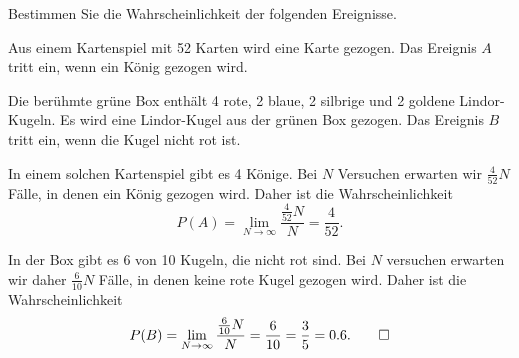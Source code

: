 Bestimmen Sie die Wahrscheinlichkeit der folgenden Ereignisse.
\begin{teilaufgaben}
\item
Aus einem Kartenspiel mit 52 Karten wird eine Karte gezogen.
Das Ereignis $A$ tritt ein, wenn ein König gezogen wird.
\item
Die berühmte grüne Box enthält 4 rote, 2 blaue,
2 silbrige und 2 goldene Lindor-Kugeln.
Es wird eine Lindor-Kugel aus der grünen Box gezogen.
Das Ereignis $B$ tritt ein, wenn die Kugel nicht rot ist.
\end{teilaufgaben}

\begin{loesung}
\begin{teilaufgaben}
\item
In einem solchen Kartenspiel gibt es 4 Könige.
Bei $N$ Versuchen erwarten wir $\frac4{52}N$ Fälle, in denen ein König
gezogen wird.
Daher ist die Wahrscheinlichkeit
\[
P(A)
=
\lim_{N\to\infty}
\frac{\frac4{52}N}{N}
=
\frac{4}{52}.
\]
\item
In der Box gibt es 6 von 10 Kugeln, die nicht rot sind.
Bei $N$ versuchen erwarten wir daher $\frac{6}{10}N$ Fälle, in denen
keine rote Kugel gezogen wird.
Daher ist die Wahrscheinlichkeit
\[
P(B)
=
\lim_{N\to\infty} \frac{\frac{6}{10}N}{N}
=
\frac{6}{10}
=
\frac{3}{5}
=
0.6.
\qedhere
\]
\end{teilaufgaben}
\end{loesung}

